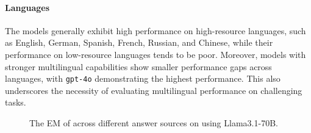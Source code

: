 \paragraph{Languages}
The models generally exhibit high performance on high-resource languages, such as English, German, Spanish, French, Russian, and Chinese, while their performance on low-resource languages tends to be poor. 
Moreover, models with stronger multilingual capabilities show smaller performance gaps across languages, with \texttt{gpt-4o} demonstrating the highest performance. 
This also underscores the necessity of evaluating multilingual performance on challenging tasks.

%     

\begin{figure}[t]
    \centering
    
    \caption{
        The EM of \ourmethod across different answer sources on \ourdataset using Llama3.1-70B.
    }
    \label{fig:answer_source}
\end{figure}

